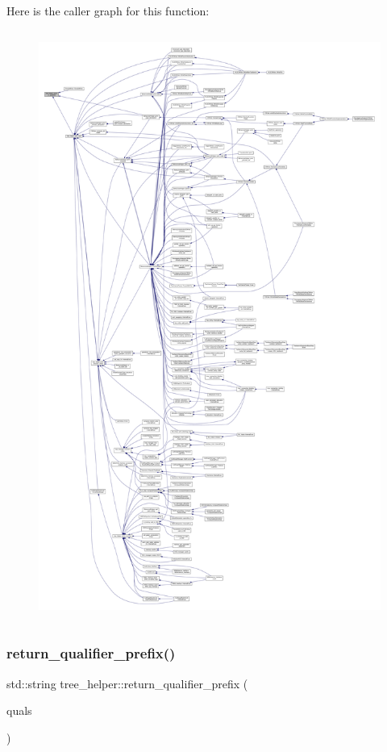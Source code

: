 Here is the caller graph for this function\+:
\nopagebreak
\begin{figure}[H]
\begin{center}
\leavevmode
\includegraphics[height=550pt]{d7/d99/classtree__helper_a0835a1c7302f0915a8dae4b22549780d_icgraph}
\end{center}
\end{figure}
\mbox{\label{classtree__helper_a48ef1be9a6f2556d79102ba30cac4190}} 
\subsubsection{\texorpdfstring{return\+\_\+qualifier\+\_\+prefix()}{return\_qualifier\_prefix()}}
{\footnotesize\ttfamily std\+::string tree\+\_\+helper\+::return\+\_\+qualifier\+\_\+prefix (\begin{DoxyParamCaption}\item[{const \hyperlink{token__interface_8hpp_a14502d0757789149f644966ca931b126}{Tree\+Vocabulary\+Token\+Types\+\_\+\+Token\+Enum}}]{quals }\end{DoxyParamCaption})\hspace{0.3cm}{\ttfamily [static]}}



